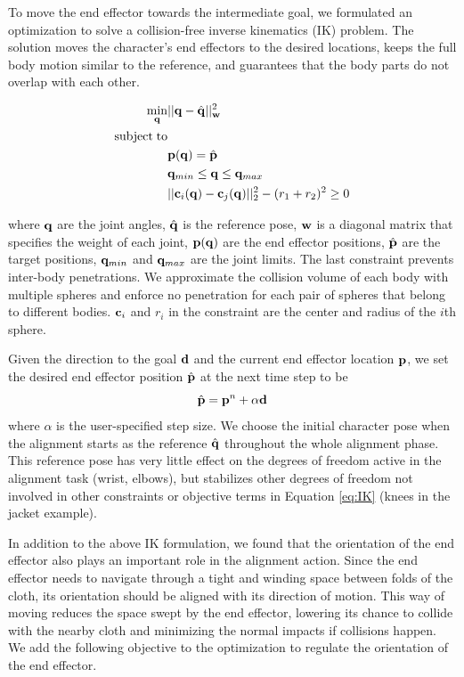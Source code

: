 To move the end effector towards the intermediate goal, we formulated an optimization to solve a collision-free inverse kinematics (IK) problem. The solution moves the character's end effectors to the desired locations, keeps the full body motion similar to the reference, and guarantees that the body parts do not overlap with each other.

\begin{align}
\label{eq:IK}
  \min_{\mathbf{q}} & ||\mathbf{q} - \hat{\mathbf{q}}||_{\mathbf{w}}^2 \\
  \nonumber  \mathrm{subject\;} \mathrm{to} & \\
  \nonumber  &\mathbf{p}(\mathbf{q}) = \hat{\mathbf{p}}\\
  \nonumber   &\mathbf{q}_{min} \leq \mathbf{q} \leq \mathbf{q}_{max}\\
  \nonumber   &||\mathbf{c}_i(\mathbf{q}) - \mathbf{c}_j(\mathbf{q})||_2^2 - (r_1 + r_2)^2 \geq 0
\end{align}

where $\mathbf{q}$ are the joint angles, $\hat{\mathbf{q}}$ is the reference pose, $\mathbf{w}$ is a diagonal matrix that specifies the weight of each joint, $\mathbf{p}(\mathbf{q})$ are the end effector positions, $\hat{\mathbf{p}}$ are the target positions, $\mathbf{q}_{min}$ and $\mathbf{q}_{max}$ are the joint limits. The last constraint prevents inter-body penetrations. We approximate the collision volume of each body with multiple spheres and enforce no penetration for each pair of spheres that belong to different bodies. $\mathbf{c}_i$ and $r_i$ in the constraint are the center and radius of the $i$th sphere.

Given the direction to the goal $\mathbf{d}$ and the current end effector location $\mathbf{p}$, we set the desired end effector position $\hat{\mathbf{p}}$ at the next time step to be
\begin{equation}
  \hat{\mathbf{p}} = \mathbf{p}^n+\alpha\mathbf{d}
  \label{eq:target}
\end{equation}
where $\alpha$ is the user-specified step size. We choose the initial character pose when the alignment starts as the reference $\hat{\mathbf{q}}$ throughout the whole alignment phase. This reference pose has very little effect on the degrees of freedom active in the alignment task (\eg wrist, elbows), but stabilizes other degrees of freedom not involved in other constraints or objective terms in Equation \ref{eq:IK} (\eg knees in the jacket example).

In addition to the above IK formulation, we found that the orientation of the end effector also plays an important role in the alignment action. Since the end effector needs to navigate  through a tight and winding space between folds of the cloth, its orientation should be aligned with its direction of motion. This way of moving reduces the space swept by the end effector, lowering its chance to collide with the nearby cloth and minimizing the normal impacts if collisions happen. We add the following objective to the optimization to regulate the orientation of the end effector.

